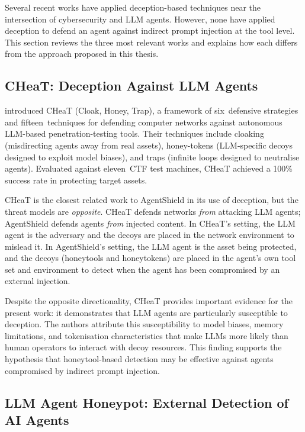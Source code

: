 Several recent works have applied deception-based techniques near the intersection of cybersecurity and LLM agents.  However, none have applied deception to defend an agent against indirect prompt injection at the tool level.  This section reviews the three most relevant works and explains how each differs from the approach proposed in this thesis.

\subsection{CHeaT: Deception Against LLM Agents}

\textcite{ayzenshteyn2025cloak} introduced CHeaT (Cloak, Honey, Trap), a framework of six~defensive strategies and fifteen~techniques for defending computer networks against autonomous LLM-based penetration-testing tools.  Their techniques include cloaking (misdirecting agents away from real assets), honey-tokens (LLM-specific decoys designed to exploit model biases), and traps (infinite loops designed to neutralise agents).  Evaluated against eleven~CTF test machines, CHeaT achieved a 100\% success rate in protecting target assets.

CHeaT is the closest related work to AgentShield in its use of deception, but the threat models are \emph{opposite}.  CHeaT defends networks \emph{from} attacking LLM agents; AgentShield defends agents \emph{from} injected content.  In CHeaT's setting, the LLM agent is the adversary and the decoys are placed in the network environment to mislead it.  In AgentShield's setting, the LLM agent is the asset being protected, and the decoys (honeytools and honeytokens) are placed in the agent's own tool set and environment to detect when the agent has been compromised by an external injection.

Despite the opposite directionality, CHeaT provides important evidence for the present work: it demonstrates that LLM agents are particularly susceptible to deception.  The authors attribute this susceptibility to model biases, memory limitations, and tokenisation characteristics that make LLMs more likely than human operators to interact with decoy resources.  This finding supports the hypothesis that honeytool-based detection may be effective against agents compromised by indirect prompt injection.

\subsection{LLM Agent Honeypot: External Detection of AI Agents}

